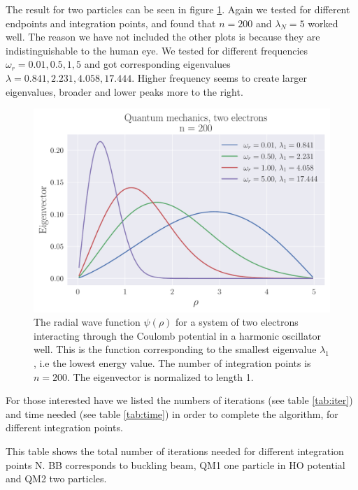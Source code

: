 \documentclass[reprint,english,notitlepage,nofootinbib]{revtex4-1}  %
\begin{document}
The result for two particles can be seen in figure \ref{fig:QM2002}. Again we tested for different endpoints and integration points, and found that $n=200$ and $\lambda_N = 5$ worked well. The reason we have not included the other plots is because they are indistinguishable to the human eye. We tested for different frequencies $\omega_r = 0.01, 0.5, 1, 5$ and got corresponding eigenvalues $\lambda = 0.841, 2.231, 4.058, 17.444$. Higher frequency seems to create larger eigenvalues, broader and lower peaks more to the right.

\begin{figure}[h]
	\centering
	\includegraphics[width=\linewidth]{../output/QM2_200.pdf}
	\caption{The radial wave function $\psi(\rho)$ for a system of two electrons interacting through the Coulomb potential in a harmonic oscillator well. This is the function corresponding to the smallest eigenvalue $\lambda_1$, i.e the lowest energy value. The number of integration points is $n = 200$. The eigenvector is normalized to length 1.}
  \label{fig:QM2002}
\end{figure}

For those interested have we listed the numbers of iterations (see table \ref{tab:iter}) and time needed (see table \ref{tab:time}) in order to complete the algorithm, for different integration points.

\begin{table}[h]
	
	\label{tab:iter}
	\caption{This table shows the total number of iterations needed for different integration points N. BB corresponds to buckling beam, QM1 one particle in HO potential and QM2 two particles.}
\end{table}
\end{document}
